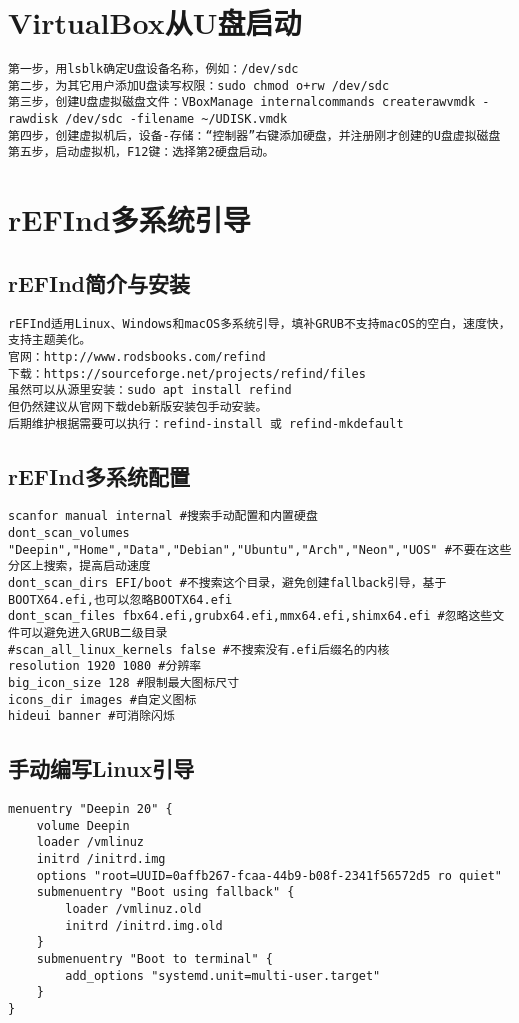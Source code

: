 \documentclass[a4paper,fontset=fandol,zihao=-4,linespread=1.2,oneside]{ctexbook}
\begin{document}
\section{VirtualBox从U盘启动}
\begin{lstlisting}
第一步，用lsblk确定U盘设备名称，例如：/dev/sdc
第二步，为其它用户添加U盘读写权限：sudo chmod o+rw /dev/sdc
第三步，创建U盘虚拟磁盘文件：VBoxManage internalcommands createrawvmdk -rawdisk /dev/sdc -filename ~/UDISK.vmdk
第四步，创建虚拟机后，设备-存储：“控制器”右键添加硬盘，并注册刚才创建的U盘虚拟磁盘
第五步，启动虚拟机，F12键：选择第2硬盘启动。
\end{lstlisting}

\section{rEFInd多系统引导}
\subsection{rEFInd简介与安装}
\begin{lstlisting}
rEFInd适用Linux、Windows和macOS多系统引导，填补GRUB不支持macOS的空白，速度快，支持主题美化。
官网：http://www.rodsbooks.com/refind
下载：https://sourceforge.net/projects/refind/files
虽然可以从源里安装：sudo apt install refind
但仍然建议从官网下载deb新版安装包手动安装。
后期维护根据需要可以执行：refind-install 或 refind-mkdefault
\end{lstlisting}

\subsection{rEFInd多系统配置}
\begin{lstlisting}
scanfor manual internal #搜索手动配置和内置硬盘
dont_scan_volumes "Deepin","Home","Data","Debian","Ubuntu","Arch","Neon","UOS" #不要在这些分区上搜索，提高启动速度
dont_scan_dirs EFI/boot #不搜索这个目录，避免创建fallback引导，基于BOOTX64.efi,也可以忽略BOOTX64.efi
dont_scan_files fbx64.efi,grubx64.efi,mmx64.efi,shimx64.efi #忽略这些文件可以避免进入GRUB二级目录
#scan_all_linux_kernels false #不搜索没有.efi后缀名的内核
resolution 1920 1080 #分辨率
big_icon_size 128 #限制最大图标尺寸
icons_dir images #自定义图标
hideui banner #可消除闪烁
\end{lstlisting}

\subsection{手动编写Linux引导}
\begin{lstlisting}
menuentry "Deepin 20" {
    volume Deepin
    loader /vmlinuz
    initrd /initrd.img
    options "root=UUID=0affb267-fcaa-44b9-b08f-2341f56572d5 ro quiet"
    submenuentry "Boot using fallback" {
        loader /vmlinuz.old
        initrd /initrd.img.old
    }
    submenuentry "Boot to terminal" {
        add_options "systemd.unit=multi-user.target"
    }
}
\end{lstlisting}
\end{document}
